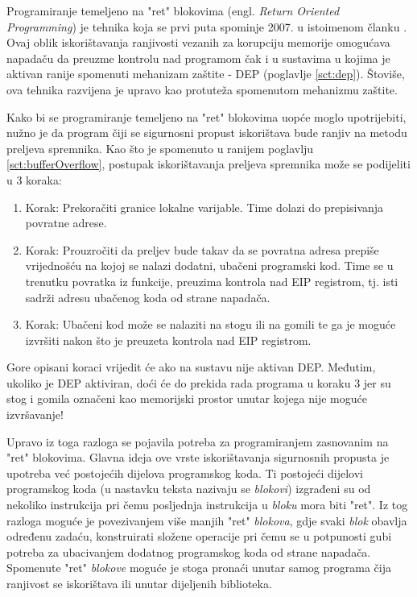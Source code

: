 \documentclass[times, utf8, diplomski, numeric]{fer}
\begin{document}
Programiranje temeljeno na "ret" blokovima (engl. \emph{Return
Oriented Programming}) je tehnika koja se prvi puta spominje
2007. u istoimenom članku \citep{rop_official}. Ovaj oblik
iskorištavanja ranjivosti vezanih za korupciju memorije omogućava
napadaču da preuzme kontrolu nad programom čak i u sustavima u
kojima je aktivan ranije spomenuti mehanizam zaštite - DEP 
(poglavlje \ref{sct:dep}). Štoviše, ova tehnika razvijena je upravo kao
protuteža spomenutom mehanizmu zaštite.

Kako bi se programiranje temeljeno na "ret" blokovima uopće moglo
upotrijebiti, nužno je da program čiji se sigurnosni propust
iskorištava bude ranjiv na metodu preljeva spremnika. Kao što je
spomenuto u ranijem poglavlju \ref{sct:bufferOverflow}, postupak
iskorištavanja preljeva spremnika može se podijeliti u 3 koraka:

\begin{enumerate}
\item Korak: Prekoračiti granice lokalne varijable. Time dolazi
do prepisivanja povratne adrese.
\item Korak: Prouzročiti da preljev bude takav da se povratna
adresa prepiše vrijednošću na kojoj se nalazi dodatni, ubačeni 
programski kod. Time se u trenutku povratka iz funkcije, preuzima kontrola
nad EIP registrom, tj. isti sadrži adresu ubačenog koda od strane
napadača.
\item Korak: Ubačeni kod može se nalaziti na stogu ili na gomili
te ga je moguće izvršiti nakon što je preuzeta kontrola nad EIP
registrom.
\end{enumerate}

Gore opisani koraci vrijedit će ako na sustavu nije aktivan
DEP. Međutim, ukoliko je DEP aktiviran, doći će do prekida rada
programa u koraku 3 jer su stog i gomila označeni kao memorijski
prostor unutar kojega nije moguće izvršavanje!

Upravo iz toga razloga se pojavila potreba za programiranjem
zasnovanim na "ret" blokovima. Glavna ideja ove vrste
iskorištavanja sigurnosnih propusta je upotreba već postojećih
dijelova programskog koda. Ti postojeći dijelovi programskog koda 
(u nastavku teksta nazivaju se \emph{blokovi}) izgrađeni su od
nekoliko instrukcija pri čemu posljednja instrukcija u \emph{bloku} mora
biti "ret". Iz tog razloga moguće je povezivanjem više manjih
"ret" \emph{blokova}, gdje svaki \emph{blok} obavlja određenu zadaću,
konstruirati složene operacije pri čemu se u potpunosti gubi
potreba za ubacivanjem dodatnog programskog koda od strane napadača. Spomenute
"ret" \emph{blokove} moguće je stoga pronaći unutar samog programa čija
ranjivost se iskorištava ili unutar dijeljenih biblioteka.
\end{document}
